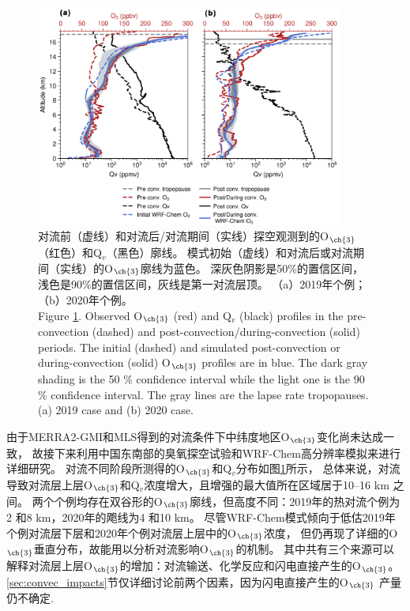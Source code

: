 \begin{figure}[H]
\centering
\includegraphics[width=0.9\textwidth]{./figures/ozonesonde_profile.png}
\caption{对流前（虚线）和对流后/对流期间（实线）探空观测到的O$_{\ch{3}}$（红色）和Q$_v$（黑色）廓线。
模式初始（虚线）和对流后或对流期间（实线）的O$_{\ch{3}}$廓线为蓝色。
深灰色阴影是50\%的置信区间，浅色是90\%的置信区间，灰线是第一对流层顶。
（a）2019年个例；（b）2020年个例。\\
Figure \ref{fig:ozonesonde_profile}. Observed O$_{\ch{3}}$ (red) and Q$_v$ (black) profiles in the pre-convection (dashed) and post-convection/during-convection (solid) periods.
The initial (dashed) and simulated post-convection or during-convection (solid) O$_{\ch{3}}$ profiles are in blue.
The dark gray shading is the 50 \% confidence interval while the light one is the 90 \% confidence interval.
The gray lines are the lapse rate tropopauses.
(a) 2019 case and (b) 2020 case.
}
\label{fig:ozonesonde_profile}
\end{figure}

由于MERRA2-GMI和MLS得到的对流条件下中纬度地区O$_{\ch{3}}$变化尚未达成一致，
故接下来利用中国东南部的臭氧探空试验和WRF-Chem高分辨率模拟来进行详细研究。
对流不同阶段所测得的O$_{\ch{3}}$和Q$_v$分布如图\ref{fig:ozonesonde_profile}所示，
总体来说，对流导致对流层上层O$_{\ch{3}}$和Q$_v$浓度增大，且增强的最大值所在区域居于10--16 km 之间。
两个个例均存在双谷形的O$_{\ch{3}}$廓线，但高度不同：2019年的热对流个例为2 和8 km，2020年的飑线为4 和10 km。
尽管WRF-Chem模式倾向于低估2019年个例对流层下层和2020年个例对流层上层中的O$_{\ch{3}}$浓度，
但仍再现了详细的O$_{\ch{3}}$垂直分布，故能用以分析对流影响O$_{\ch{3}}$的机制。
其中共有三个来源可以解释对流层上层O$_{\ch{3}}$的增加：对流输送、化学反应和闪电直接产生的O$_{\ch{3}}$。
\ref{sec:convec_impacts}节仅详细讨论前两个因素，因为闪电直接产生的O$_{\ch{3}}$
产量仍不确定\citep{Morris.2010,Ripoll.2014}.

